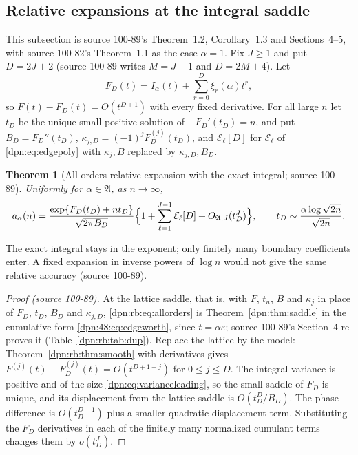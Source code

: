 \documentclass[11pt]{article}
\numberwithin{equation}{section}
\newtheorem{theorem}{Theorem}[section]
\theoremstyle{definition}\newtheorem{definition}[theorem]{Definition}
\theoremstyle{remark}\newtheorem{remark}[theorem]{Remark}
\newcommand{\eps}{\varepsilon}
\newcommand{\src}[1]{\textup{(source #1)}}
\begin{document}
\subsection{Relative expansions at the integral saddle}\label{dpn:rb:sec:relative}
This subsection is source 100-89's Theorem~1.2, Corollary~1.3 and
Sections~4--5, with source 100-82's Theorem~1.1 as the case $\alpha=1$.  Fix
$J\ge1$ and put $D=2J+2$ (source 100-89 writes $M=J-1$ and $D=2M+4$).  Let
\begin{equation}\label{dpn:rb:eq:FD}
 F_D(t)=I_\alpha(t)+\sum_{r=0}^D\xi_r(\alpha)t^r,
\end{equation}
so $F(t)-F_D(t)=O(t^{D+1})$ with every fixed derivative.  For all large $n$
let $t_D$ be the unique small positive solution of $-F_D'(t_D)=n$, and put
$B_D=F_D''(t_D)$, $\kappa_{j,D}=(-1)^jF_D^{(j)}(t_D)$, and
$\mathcal E_\ell[D]$ for $\mathcal E_\ell$ of \eqref{dpn:eq:edgepoly} with
$\kappa_j,B$ replaced by $\kappa_{j,D},B_D$.

\begin{theorem}[All-orders relative expansion with the exact integral; source 100-89]\label{dpn:rb:thm:allorders}
Uniformly for $\alpha\in\mathfrak A$, as $n\to\infty$,
\begin{equation}\label{dpn:rb:eq:allorders}
 a_\alpha(n)=\frac{\exp\{F_D(t_D)+nt_D\}}{\sqrt{2\pi B_D}}
 \Bigl\{1+\sum_{\ell=1}^{J-1}\mathcal E_\ell[D]+O_{\mathfrak A,J}(t_D^{J})\Bigr\},
 \qquad t_D\sim\frac{\alpha\log\sqrt{2n}}{\sqrt{2n}}.
\end{equation}
\end{theorem}
The exact integral stays in the exponent; only finitely many boundary
coefficients enter.  A fixed expansion in inverse powers of $\log n$ would
not give the same relative accuracy \src{100-89}.

\begin{proof}[Proof \src{100-89}]
At the lattice saddle, that is, with $F$, $t_n$, $B$ and $\kappa_j$ in
place of $F_D$, $t_D$, $B_D$ and $\kappa_{j,D}$, \eqref{dpn:rb:eq:allorders} is
Theorem~\ref{dpn:thm:saddle} in the cumulative form \eqref{dpn:48:eq:edgeworth}, since $t=\alpha\eps$; source
100-89's Section~4 re-proves it (Table~\ref{dpn:rb:tab:dup}).  Replace the
lattice by the model: Theorem~\ref{dpn:rb:thm:smooth} with derivatives gives
$F^{(j)}(t)-F_D^{(j)}(t)=O(t^{D+1-j})$ for $0\le j\le D$.  The integral
variance is positive and of the size \eqref{dpn:eq:varianceleading}, so the
small saddle of $F_D$ is unique, and its displacement from the lattice saddle
is $O(t_D^D/B_D)$.  The phase difference is $O(t_D^{D+1})$ plus a smaller
quadratic displacement term.  Substituting the $F_D$ derivatives in each of
the finitely many normalized cumulant terms changes them by $o(t_D^{J})$.
\end{proof}
\end{document}
